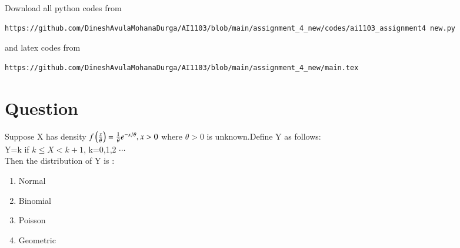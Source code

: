 \documentclass[journal,12pt,twocolumn]{IEEEtran}
\begin{document}
\author{Name: Avula Mohana Durga Dinesh Reddy , Roll Number: CS20BTECH11005}
\maketitle
\newpage
\bigskip
\renewcommand{\thefigure}{\theenumi}
\renewcommand{\thetable}{\theenumi}
Download all python codes from 
\begin{lstlisting}
https://github.com/DineshAvulaMohanaDurga/AI1103/blob/main/assignment_4_new/codes/ai1103_assignment4 new.py
\end{lstlisting}
%
and latex codes from 
%
\begin{lstlisting}
https://github.com/DineshAvulaMohanaDurga/AI1103/blob/main/assignment_4_new/main.tex
\end{lstlisting}
\section{Question}
Suppose X has density $f\left(\frac{x}{\theta}\right)=\frac{1}{\theta} e^{-x/\theta},x>0$ where $\theta > 0$ is unknown.Define Y as follows:\\
Y=k if $k \leq X < k+1$, k=0,1,2 $\cdots$\\
Then the distribution of Y is :
\begin{enumerate}
\item Normal 
\item Binomial 
\item Poisson 
\item Geometric
\end{enumerate}
\end{document}
